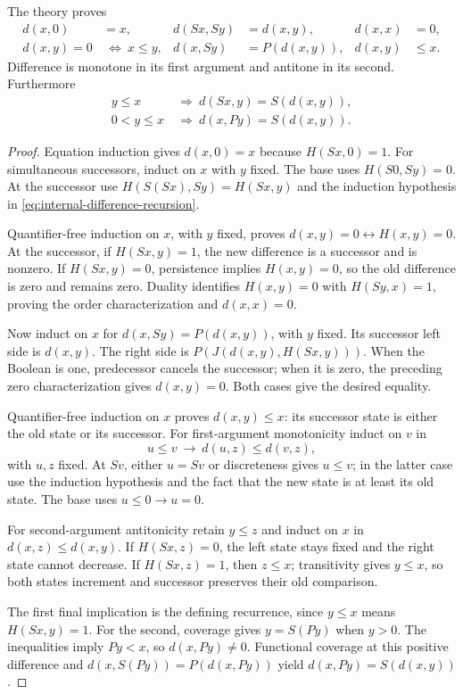 \begin{lemma}
\label{lem:internal-difference}
The theory proves
\begin{align*}
 d(x,0)&=x,& d(Sx,Sy)&=d(x,y),&d(x,x)&=0,\\
 d(x,y)=0&\ \Longleftrightarrow\ x\le y,
 &d(x,Sy)&=P(d(x,y)),&d(x,y)&\le x.
\end{align*}
Difference is monotone in its first argument and antitone in its second.
Furthermore
\begin{align*}
 y\le x&\ \Longrightarrow\ d(Sx,y)=S(d(x,y)),\\
 0<y\le x&\ \Longrightarrow\ d(x,Py)=S(d(x,y)).
\end{align*}
\end{lemma}
\begin{proof}
Equation induction gives $d(x,0)=x$ because $H(Sx,0)=1$.
For simultaneous successors, induct on $x$ with $y$ fixed.  The base
uses $H(S0,Sy)=0$.  At the successor use
$H(S(Sx),Sy)=H(Sx,y)$ and the induction hypothesis in
\eqref{eq:internal-difference-recursion}.

Quantifier-free induction on $x$, with $y$ fixed, proves
$d(x,y)=0\leftrightarrow H(x,y)=0$.
At the successor, if $H(Sx,y)=1$, the new difference is a successor and
is nonzero.  If $H(Sx,y)=0$, persistence implies $H(x,y)=0$, so the old
difference is zero and remains zero.  Duality identifies $H(x,y)=0$
with $H(Sy,x)=1$, proving the order characterization and $d(x,x)=0$.

Now induct on $x$ for $d(x,Sy)=P(d(x,y))$, with $y$ fixed.  Its successor
left side is $d(x,y)$.  The right side is
$P(J(d(x,y),H(Sx,y)))$.  When the Boolean is one, predecessor cancels
the successor; when it is zero, the preceding zero characterization
gives $d(x,y)=0$.  Both cases give the desired equality.

Quantifier-free induction on $x$ proves $d(x,y)\le x$: its successor
state is either the old state or its successor.  For first-argument
monotonicity induct on $v$ in
\[
       u\le v\ \longrightarrow\ d(u,z)\le d(v,z),
\]
with $u,z$ fixed.  At $Sv$, either $u=Sv$ or discreteness gives $u\le v$;
in the latter case use the induction hypothesis and the fact that the
new state is at least its old state.  The base uses $u\le0\to u=0$.

For second-argument antitonicity retain $y\le z$ and induct on $x$ in
$d(x,z)\le d(x,y)$.  If $H(Sx,z)=0$, the left state stays fixed and
the right state cannot decrease.  If $H(Sx,z)=1$, then $z\le x$;
transitivity gives $y\le x$, so both states increment and successor
preserves their old comparison.

The first final implication is the defining recurrence, since
$y\le x$ means $H(Sx,y)=1$.  For the second, coverage gives
$y=S(Py)$ when $y>0$.  The inequalities imply $Py<x$, so
$d(x,Py)\ne0$.  Functional coverage at this positive difference and
$d(x,S(Py))=P(d(x,Py))$ yield
$d(x,Py)=S(d(x,y))$.
\end{proof}

